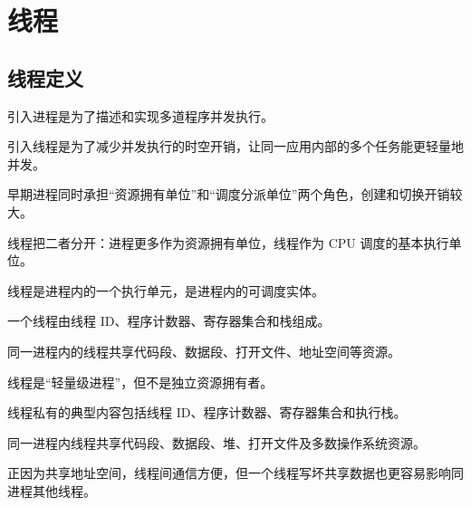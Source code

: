 \chapter{线程}

\section{线程定义}
\begin{points}
  \item 引入进程是为了描述和实现多道程序并发执行。
  \item 引入线程是为了减少并发执行的时空开销，让同一应用内部的多个任务能更轻量地并发。
  \item 早期进程同时承担“资源拥有单位”和“调度分派单位”两个角色，创建和切换开销较大。
  \item 线程把二者分开：进程更多作为资源拥有单位，线程作为 CPU 调度的基本执行单位。
\end{points}


\begin{points}
  \item 线程是进程内的一个执行单元，是进程内的可调度实体。
  \item 一个线程由线程 ID、程序计数器、寄存器集合和栈组成。
  \item 同一进程内的线程共享代码段、数据段、打开文件、地址空间等资源。
  \item 线程是“轻量级进程”，但不是独立资源拥有者。
\end{points}


\begin{points}
  \item 线程私有的典型内容包括线程 ID、程序计数器、寄存器集合和执行栈。
  \item 同一进程内线程共享代码段、数据段、堆、打开文件及多数操作系统资源。
  \item 正因为共享地址空间，线程间通信方便，但一个线程写坏共享数据也更容易影响同进程其他线程。
\end{points}


